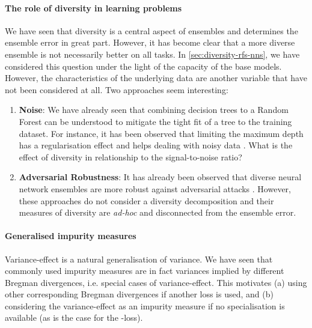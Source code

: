 \documentclass[
	twoside=false, %
]{kaobook}
\begin{document}



\paragraph{The role of diversity in learning problems} We have seen that diversity is a central aspect of ensembles and determines the ensemble error in great part. However, it has become clear that a more diverse ensemble is not necessarily better on all tasks. In \cref{sec:diversity-rfs-nns}, we have considered this question under the light of the capacity of the base models. However, the characteristics of the underlying data are another variable that have not been considered at all. Two approaches seem interesting:
\begin{enumerate}
\item \textbf{Noise}: We have already seen that combining decision trees to a Random Forest can be understood to mitigate the tight fit of a tree to the training dataset. For instance, it has been observed that limiting the maximum depth has a regularisation effect and helps dealing with noisy data \cite{zhou_TreesForestsChickens_2023}. What is the effect of diversity in relationship to the signal-to-noise ratio?
\item \textbf{Adversarial Robustness}: It has already been observed that diverse neural network ensembles are more robust against adversarial attacks \cite{pang_ImprovingAdversarialRobustness_2019,amada_AdversarialRobustnessFace_}. However, these approaches do not consider a diversity decomposition and their measures of diversity are \textit{ad-hoc} and disconnected from the ensemble error.
\end{enumerate}


\paragraph{Generalised impurity measures}
Variance-effect is a natural generalisation of variance. We have seen that commonly used impurity measures are in fact variances implied by different Bregman divergences, i.e. special cases of variance-effect. This motivates (a) using other corresponding Bregman divergences if another loss is used, and (b) considering the variance-effect as an impurity measure if no specialisation is available (as is the case for the \zeroone-loss).
\end{document}
